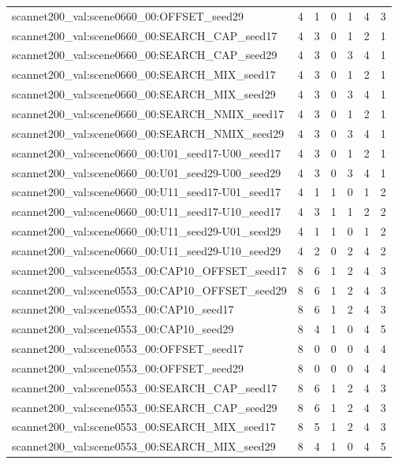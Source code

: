 \begin{table}[t]
\begin{tabular}{lrrrrrr}
scannet200\_val:scene0660\_00:OFFSET\_seed29 & 4 & 1 & 0 & 1 & 4 & 3 \\
scannet200\_val:scene0660\_00:SEARCH\_CAP\_seed17 & 4 & 3 & 0 & 1 & 2 & 1 \\
scannet200\_val:scene0660\_00:SEARCH\_CAP\_seed29 & 4 & 3 & 0 & 3 & 4 & 1 \\
scannet200\_val:scene0660\_00:SEARCH\_MIX\_seed17 & 4 & 3 & 0 & 1 & 2 & 1 \\
scannet200\_val:scene0660\_00:SEARCH\_MIX\_seed29 & 4 & 3 & 0 & 3 & 4 & 1 \\
scannet200\_val:scene0660\_00:SEARCH\_NMIX\_seed17 & 4 & 3 & 0 & 1 & 2 & 1 \\
scannet200\_val:scene0660\_00:SEARCH\_NMIX\_seed29 & 4 & 3 & 0 & 3 & 4 & 1 \\
scannet200\_val:scene0660\_00:U01\_seed17-U00\_seed17 & 4 & 3 & 0 & 1 & 2 & 1 \\
scannet200\_val:scene0660\_00:U01\_seed29-U00\_seed29 & 4 & 3 & 0 & 3 & 4 & 1 \\
scannet200\_val:scene0660\_00:U11\_seed17-U01\_seed17 & 4 & 1 & 1 & 0 & 1 & 2 \\
scannet200\_val:scene0660\_00:U11\_seed17-U10\_seed17 & 4 & 3 & 1 & 1 & 2 & 2 \\
scannet200\_val:scene0660\_00:U11\_seed29-U01\_seed29 & 4 & 1 & 1 & 0 & 1 & 2 \\
scannet200\_val:scene0660\_00:U11\_seed29-U10\_seed29 & 4 & 2 & 0 & 2 & 4 & 2 \\
scannet200\_val:scene0553\_00:CAP10\_OFFSET\_seed17 & 8 & 6 & 1 & 2 & 4 & 3 \\
scannet200\_val:scene0553\_00:CAP10\_OFFSET\_seed29 & 8 & 6 & 1 & 2 & 4 & 3 \\
scannet200\_val:scene0553\_00:CAP10\_seed17 & 8 & 6 & 1 & 2 & 4 & 3 \\
scannet200\_val:scene0553\_00:CAP10\_seed29 & 8 & 4 & 1 & 0 & 4 & 5 \\
scannet200\_val:scene0553\_00:OFFSET\_seed17 & 8 & 0 & 0 & 0 & 4 & 4 \\
scannet200\_val:scene0553\_00:OFFSET\_seed29 & 8 & 0 & 0 & 0 & 4 & 4 \\
scannet200\_val:scene0553\_00:SEARCH\_CAP\_seed17 & 8 & 6 & 1 & 2 & 4 & 3 \\
scannet200\_val:scene0553\_00:SEARCH\_CAP\_seed29 & 8 & 6 & 1 & 2 & 4 & 3 \\
scannet200\_val:scene0553\_00:SEARCH\_MIX\_seed17 & 8 & 5 & 1 & 2 & 4 & 3 \\
scannet200\_val:scene0553\_00:SEARCH\_MIX\_seed29 & 8 & 4 & 1 & 0 & 4 & 5 \\

\end{tabular}
\end{table}

